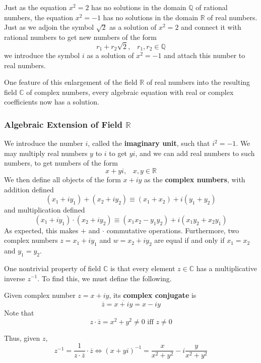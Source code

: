     Just as the equation $x^2 = 2$ has no solutions in the domain $\mathbb{Q}$ of rational numbers, the equation $x^2 = -1$ has no solutions in the domain $\mathbb{R}$ of real numbers. Just as we adjoin the symbol $\sqrt{2}$ as a solution of $x^2 = 2$ and connect it with rational numbers to get new numbers of the form 
    \[r_1 + r_2 \sqrt{2}, \;\;\; r_1, r_2 \in \mathbb{Q}\]
    we introduce the symbol $i$ as a solution of $x^2 = -1$ and attach this number to real numbers. 

    One feature of this enlargement of the field $\mathbb{R}$ of real numbers into the resulting field $\mathbb{C}$ of complex numbers, every algebraic equation with real or complex coefficients now has a solution. 

    \subsubsection[Algebraic Extension of Field R]{Algebraic Extension of Field $\mathbb{R}$}
    We introduce the number $i$, called the \textbf{imaginary unit}, such that $i^2 = -1$. We may multiply real numbers $y$ to $i$ to get $yi$, and we can add real numbers to such numbers, to get numbers of the form 
    \[x + yi, \;\;\; x, y \in \mathbb{R}\]
    We then define all objects of the form $x + iy$ as the \textbf{complex numbers}, with addition defined
    \[(x_1 + i y_1) + (x_2 + i y_2) \equiv (x_1 + x_2) + i (y_1 + y_2)\]
    and multiplication defined
    \[(x_1 + i y_1) \cdot (x_2 + i y_2) \equiv (x_1 x_2 - y_1 y_2) + i (x_1 y_2 + x_2 y_1)\]
    As expected, this makes $+$ and $\cdot$ commutative operations. Furthermore, two complex numbers $z = x_1 + i y_1$ and $w = x_2 + i y_2$ are equal if and only if $x_1 = x_2$ and $y_1 = y_2$. 

    One nontrivial property of field $\mathbb{C}$ is that every element $z \in \mathbb{C}$ has a multiplicative inverse $z^{-1}$. To find this, we must define the following. 

    \begin{definition}
      Given complex number $z = x + i y$, its \textbf{complex conjugate} is 
      \[\overline{z} = \overline{x + iy} = x - iy\]
      Note that 
      \[z \cdot \overline{z} = x^2 + y^2 \neq 0 \text{ iff } z \neq 0\]
    \end{definition}

    Thus, given $z$, 
    \[z^{-1} = \frac{1}{z \cdot \overline{z}} \cdot \overline{z} \iff (x + yi)^{-1} = \frac{x}{x^2 + y^2} - i \frac{y}{x^2 + y^2}\]

